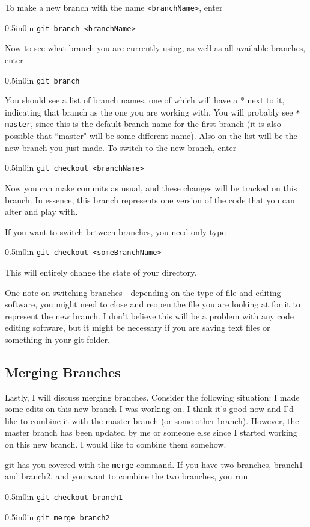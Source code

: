 \documentclass[11pt]{article}
\newcommand{\code}[1]{\begin{adjustwidth}{0.5in}{0in}
    \texttt{#1}
    \end{adjustwidth}}
\begin{document}
To make a new branch with the name \texttt{<branchName>}, enter

\code{git branch <branchName>}

Now to see what branch you are currently using, as well as all available branches, enter

\code{git branch}

You should see a list of branch names, one of which will have a * next to it, indicating that branch as the one you are working with.  You will probably see \texttt{* master}, since this is the default branch name for the first branch (it is also possible that ``master" will be some different name).  Also on the list will be the new branch you just made.  To switch to the new branch, enter

\code{git checkout <branchName>}

Now you can make commits as usual, and these changes will be tracked on this branch.  In essence, this branch represents one version of the code that you can alter and play with. 

If you want to switch between branches, you need only type

\code{git checkout <someBranchName>}

This will entirely change the state of your directory.  

One note on switching branches - depending on the type of file and editing software, you might need to close and reopen the file you are looking at for it to represent the new branch.  I don't believe this will be a problem with any code editing software, but it might be necessary if you are saving text files or something in your git folder.

\subsection{Merging Branches}

Lastly, I will discuss merging branches.  Consider the following situation:  I made some edits on this new branch I was working on.  I think it's good now and I'd like to combine it with the master branch (or some other branch).  However, the master branch has been updated by me or someone else since I started working on this new branch.  I would like to combine them somehow.

git has you covered with the \texttt{merge} command.  If you have two branches, branch1 and branch2, and you want to combine the two branches, you run

\code{git checkout branch1}
\code{git merge branch2}
\end{document}
